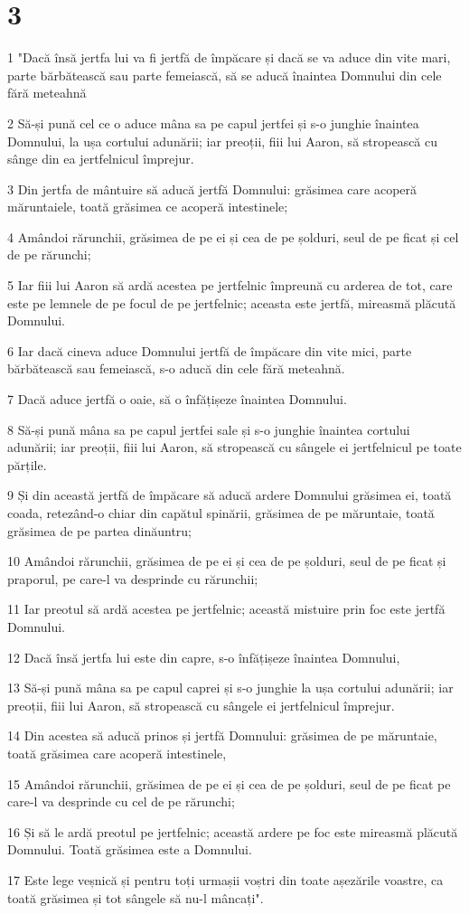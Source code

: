 \chapter{3}

\par 1 "Dacă însă jertfa lui va fi jertfă de împăcare și dacă se va aduce din vite mari, parte bărbătească sau parte femeiască, să se aducă înaintea Domnului din cele fără meteahnă
\par 2 Să-și pună cel ce o aduce mâna sa pe capul jertfei și s-o junghie înaintea Domnului, la ușa cortului adunării; iar preoții, fiii lui Aaron, să stropească cu sânge din ea jertfelnicul împrejur.
\par 3 Din jertfa de mântuire să aducă jertfă Domnului: grăsimea care acoperă măruntaiele, toată grăsimea ce acoperă intestinele;
\par 4 Amândoi rărunchii, grăsimea de pe ei și cea de pe șolduri, seul de pe ficat și cel de pe rărunchi;
\par 5 Iar fiii lui Aaron să ardă acestea pe jertfelnic împreună cu arderea de tot, care este pe lemnele de pe focul de pe jertfelnic; aceasta este jertfă, mireasmă plăcută Domnului.
\par 6 Iar dacă cineva aduce Domnului jertfă de împăcare din vite mici, parte bărbătească sau femeiască, s-o aducă din cele fără meteahnă.
\par 7 Dacă aduce jertfă o oaie, să o înfățișeze înaintea Domnului.
\par 8 Să-și pună mâna sa pe capul jertfei sale și s-o junghie înaintea cortului adunării; iar preoții, fiii lui Aaron, să stropească cu sângele ei jertfelnicul pe toate părțile.
\par 9 Și din această jertfă de împăcare să aducă ardere Domnului grăsimea ei, toată coada, retezând-o chiar din capătul spinării, grăsimea de pe măruntaie, toată grăsimea de pe partea dinăuntru;
\par 10 Amândoi rărunchii, grăsimea de pe ei și cea de pe șolduri, seul de pe ficat și praporul, pe care-l va desprinde cu rărunchii;
\par 11 Iar preotul să ardă acestea pe jertfelnic; această mistuire prin foc este jertfă Domnului.
\par 12 Dacă însă jertfa lui este din capre, s-o înfățișeze înaintea Domnului,
\par 13 Să-și pună mâna sa pe capul caprei și s-o junghie la ușa cortului adunării; iar preoții, fiii lui Aaron, să stropească cu sângele ei jertfelnicul împrejur.
\par 14 Din acestea să aducă prinos și jertfă Domnului: grăsimea de pe măruntaie, toată grăsimea care acoperă intestinele,
\par 15 Amândoi rărunchii, grăsimea de pe ei și cea de pe șolduri, seul de pe ficat pe care-l va desprinde cu cel de pe rărunchi;
\par 16 Și să le ardă preotul pe jertfelnic; această ardere pe foc este mireasmă plăcută Domnului. Toată grăsimea este a Domnului.
\par 17 Este lege veșnică și pentru toți urmașii voștri din toate așezările voastre, ca toată grăsimea și tot sângele să nu-l mâncați".

